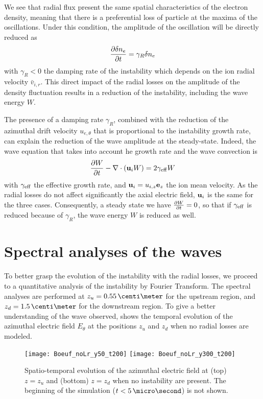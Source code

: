   We see that radial flux present the same spatial characteristics of the electron density, meaning that there is a preferential loss of particle at the maxima of the oscillations.
  Under this condition, the amplitude of the oscillation will be directly reduced as
  \[ \frac{\partial \delta n_e}{\partial t} =  \gamma_R \delta n_e \]
  with $\gamma_R < 0$ the damping rate of the instability which depends on the ion radial velocity $ \bar{v}_{i, r}$.
  This direct impact of the radial losses on the amplitude of the density fluctuation results in a reduction of the instability, including the wave energy $W$.
  
  \vspace{1em}
  The presence of a damping rate $\gamma_R$, combined with the reduction of the azimuthal drift velocity $u_{e, \theta}$ that is proportional to the instability growth rate, can explain the reduction of the wave amplitude at the steady-state.
  Indeed, the wave equation that takes into account he growth rate and the wave convection is \citep{martorelli2019}
  \begin{equation} \label{eq-wequation}
    \frac{\partial W}{\partial t} - \nabla \cdot ({\mathbf u_i} W) = 2 \gamma_{\rm eff} W
  \end{equation}
  with $\gamma_{\rm eff}$ the effective growth rate, and ${\mathbf u_i} =u_{i, z} {\mathbf e_z}$  the ion mean velocity.
  As the radial losses do not affect significantly the axial electric field, ${\mathbf u_i}$ is the same for the three cases.
  Consequently, a steady state we have $\frac{\partial W}{\partial t}=0$, so that if $\gamma_{\rm eff}$ is reduced because of $\gamma_R$, the wave energy $W$ is reduced as well.

  \FloatBarrier

\section{Spectral analyses of the waves} \label{subsec-fft}

  To better grasp the evolution of the instability with the radial losses, we proceed to a quantitative analysis of the instability by Fourier Transform.
  The spectral analyses are performed at $z_u=0.55\,\centi\meter$ for the upstream region, and $z_d=1.5\,\centi\meter$ for the downstream region.
  To give a better understanding of the wave observed,  shows the temporal evolution of the azimuthal electric field $E_{\theta}$  at the positions $z_u$ and $z_d$ when no radial losses are modeled.

  \begin{figure}[!hbt]
    \centering
    \texttt{[image: Boeuf\_noLr\_y50\_t200]}
    \texttt{[image: Boeuf\_noLr\_y300\_t200]}
    \caption{Spatio-temporal evolution of the azimuthal electric field at (top) $z=z_u$ and (bottom) $z=z_d$ when no instability are present. The beginning of the simulation ($t<5\,\micro\second$) is not shown. }
    \label{fig-cut2D}
  \end{figure}


